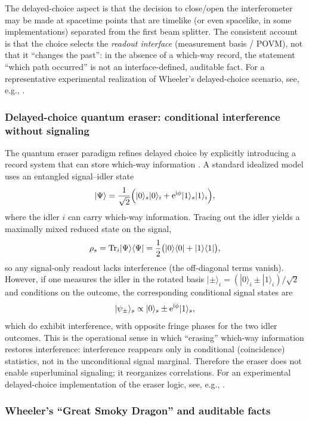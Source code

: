 The delayed-choice aspect is that the decision to close/open the interferometer may be made at spacetime points that are timelike (or even spacelike, in some implementations) separated from the first beam splitter.
The consistent account is that the choice selects the \emph{readout interface} (measurement basis / POVM), not that it ``changes the past'':
in the absence of a which-way record, the statement ``which path occurred'' is not an interface-defined, auditable fact.
For a representative experimental realization of Wheeler's delayed-choice scenario, see, e.g., \cite{JacquesEtAl2007DelayedChoice}.

\subsubsection{Delayed-choice quantum eraser: conditional interference without signaling}
\label{subsec:delayed_choice_eraser}

The quantum eraser paradigm refines delayed choice by explicitly introducing a record system that can store which-way information \cite{ScullyDruhl1982QuantumEraser}.
A standard idealized model uses an entangled signal--idler state
$$
|\Psi\rangle=\frac{1}{\sqrt{2}}\Bigl(|0\rangle_s|0\rangle_i+\mathrm{e}^{\mathrm{i}\phi}|1\rangle_s|1\rangle_i\Bigr),
$$
where the idler $i$ can carry which-way information.
Tracing out the idler yields a maximally mixed reduced state on the signal,
$$
\rho_s=\mathrm{Tr}_i|\Psi\rangle\langle\Psi|=\frac{1}{2}\bigl(|0\rangle\langle 0|+|1\rangle\langle 1|\bigr),
$$
so any signal-only readout lacks interference (the off-diagonal terms vanish).
However, if one measures the idler in the rotated basis $|\pm\rangle_i=(|0\rangle_i\pm |1\rangle_i)/\sqrt{2}$ and conditions on the outcome,
the corresponding conditional signal states are
$$
|\psi_\pm\rangle_s\propto |0\rangle_s\pm \mathrm{e}^{\mathrm{i}\phi}|1\rangle_s,
$$
which do exhibit interference, with opposite fringe phases for the two idler outcomes.
This is the operational sense in which ``erasing'' which-way information restores interference: interference reappears only in conditional (coincidence) statistics, not in the unconditional signal marginal.
Therefore the eraser does not enable superluminal signaling; it reorganizes correlations.
For an experimental delayed-choice implementation of the eraser logic, see, e.g., \cite{KimEtAl2000DelayedChoiceQuantumEraser}.

\subsubsection{Wheeler's ``Great Smoky Dragon'' and auditable facts}
\label{subsec:smoky_dragon}

